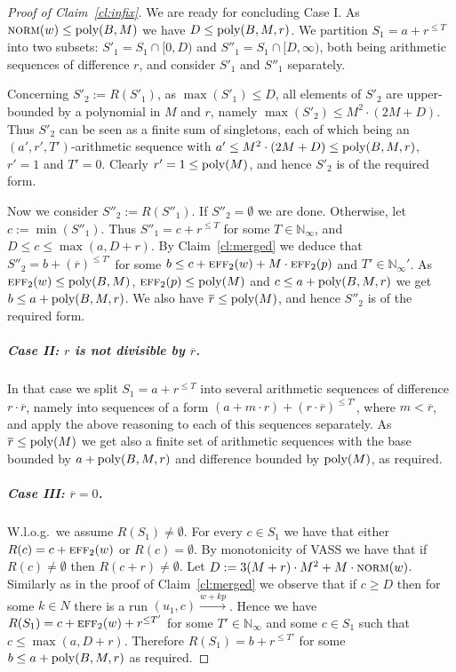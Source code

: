 \documentclass[a4paper, UKenglish, cleveref, autoref, thm-restate]{lipics-v2021}
\newcommand{\N}{\mathbb{N}}
\newcommand{\trans}[1]{\stackrel{#1}{\longrightarrow}}
\newcommand{\norm}{\textsc{norm}}
\newcommand{\eff}{\textsc{eff}}
\newcommand{\poly}{\textup{poly}}
\newcommand{\para}[1]{\vspace{-3mm}\subparagraph*{\bf #1.}}
\newcommand{\Wlog}{W.l.o.g.~}
\newcommand{\essdvass}[1]{\overline{#1}}
\begin{document}
\begin{appendixproof}
\begin{proof}[Proof of Claim~\ref{cl:infix}]
We are ready for concluding Case I.
As $\norm(w) \leq \poly(B, M)$ we have $D \leq \poly(B, M, r)$.
We  partition $S_1 = a + r^{\leq T}$ into two subsets: $S'_1 = S_1 \cap [0,D)$
and $S''_1 = S_1 \cap [D,\infty)$, both being arithmetic sequences of difference $r$,
and consider $S'_1$ and $S''_1$ separately.
 
Concerning $S'_2:= R(S'_1)$,
as $\max(S'_1) \leq D$, all
elements of $S'_2$ are upper-bounded by a polynomial in $M$ and $r$, namely
$\max(S'_2) \leq M^2 \cdot (2M + D)$. 
Thus $S'_2$ can be seen as a finite sum of singletons, each of which
being an $(a', r', T')$-arithmetic sequence with $a' \leq M^2 \cdot (2M + D) \leq \poly(B,M,r)$,
$r' = 1$ and $T' = 0$. 
Clearly $r' = 1 \leq \poly(M)$, and hence $S'_2$ is of the required form.

Now we consider $S''_2:= R(S''_1)$.
If $S''_2 = \emptyset$ we are done.
Otherwise, let $c:= \min(S''_1)$.
Thus $S''_1 = c+r^{\leq T}$ for some $T \in \N_\infty$, 
and $D\leq c \leq \max(a, D+r)$.
By Claim~\ref{cl:merged} we deduce that
$S''_2 = b + (\essdvass r)^{\leq T'}$ for some 
$b \leq c + \eff_2(w) + M \cdot \eff_2(p)$ and $T' \in \N_\infty'$. 
As $\eff_2(w) \leq \poly(B,M)$, $\eff_2(p) \leq \poly(M)$ and $c \leq a + \poly(B,M, r)$ we get $b \leq a + \poly(B, M, r)$.
We also have $\essdvass r \leq \poly(M)$, and hence
$S''_2$ is of the required form.


\para{Case II: $r$ is not divisible by $\essdvass r$}


In that case we split $S_1 = a + r^{\leq T}$ into several
arithmetic sequences of difference $r \cdot \essdvass r$, namely into sequences of a form 
$(a + m \cdot r) + (r \cdot \essdvass r)^{\leq T'}$, where $m < \essdvass r$, 
and apply the above reasoning to each of this sequences separately. 
As $\essdvass r \leq \poly(M)$
we get also a finite set of arithmetic sequences with the base bounded by $a + \poly(B, M,r)$ and difference bounded by $\poly(M)$,
as required.

\para{Case III: $\essdvass r = 0$}
\Wlog we assume $R(S_1) \neq \emptyset$. For every $c \in S_1$ we have that either $R(c) = c + \eff_2(w)$ or $R(c) = \emptyset$. By monotonicity of VASS we have that if $R(c) \neq \emptyset$ then $R(c+r) \neq \emptyset$. Let $D := 3(M+r) \cdot M^2 + M \cdot \norm(w)$. Similarly as in the proof of Claim~\ref{cl:merged} we observe that if $c \geq D$ then for some $k \in N$ there is a run $(u_1, c) \trans{w+kp}$. Hence we have $R(S_1) = c + \eff_2(w) + r^{\leq T'}$ for some $T' \in \N_\infty$ and some $c \in S_1$ such that $c \leq \max(a, D+r)$. Therefore $R(S_1) = b + r^{\leq T'}$ for some $b \leq a + \poly(B,M,r)$ as required.


\end{proof}
\end{appendixproof}
\end{document}
